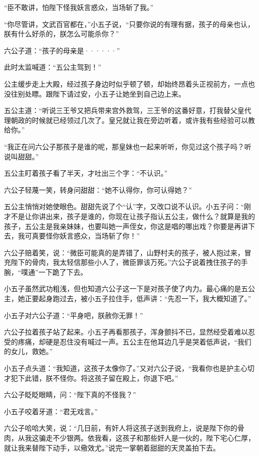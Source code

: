 “臣不敢讲，怕陛下怪我妖言惑众，当场斩了我。”

“你尽管讲，文武百官都在，”小五子说，“只要你说的有理有据，孩子的母亲也认，朕有什么好杀的，朕怎么可能杀你？”

六公子道：“孩子的母亲是······”

此时太监喊道：“五公主驾到！”
\newline

公主缓步走上大殿，经过孩子身边时似乎顿了顿，却始终昂着头正视前方，一点也没往别处瞟。跟陛下请过安，小五子让她坐到自己边上来。

五公主道：“听说三王爷又把兵带来宫外救驾，三王爷的这番好意，打我替父皇代理朝政的时候就已经领过几次了。皇兄就让我在旁边听着，或许我有些经验可以教给你。”

“我正在问六公子那孩子是谁的呢，那皇妹也一起来听听，你见过这个孩子吗？听说叫甜甜。”

五公主盯着孩子看了半天，才吐出三个字：“不认识。”

六公子轻蔑一笑，转身问甜甜：“她不认得你，你可认得她？”

五公主悄悄对她使眼色。甜甜先说了个“认”字，又改口说不认识。小五子问：“刚才不是让你讲出来，孩子是谁的，你现在让孩子指认五公主，做什么？就算是我的孩子，五公主是我亲妹妹，也要叫她一声侄女，你这是唱的哪出戏？你要是再讲下去，我可真要怪你妖言惑众，当场斩了你！”

六公子赔着笑，说：“微臣可能真的是弄错了，山野村夫的孩子，被人抱过来，冒充陛下的骨肉，我太轻信那些小人了，微臣罪该万死。”六公子说着拽住孩子的手腕，“噗通”一下跪了下去。

小五子虽然武功粗浅，但也知道六公子这一下是对孩子使了内力。最心痛的是五公主，她正要起身跑过去，被小五子拉住手，低声讲：“先忍一下，我大概知道了。”

小五子对六公子道：“平身吧，朕赦你无罪！”

六公子拉着孩子站了起来。小五子再看那孩子，浑身颤抖不已，显然经受着难以忍受的疼痛，却硬是忍住没有喊过一声。五公主在他耳边几乎是哭着低声说，“我们的女儿，救她。”

小五子点头道：“我知道，这孩子太像你了。”又对六公子说，“我看你也是护主心切才犯下此错，朕不怪你。将这孩子留在殿上，你退下吧。”

六公子眨眨眼睛，问：“陛下真的不怪我？”

小五子咬着牙道：“君无戏言。”

六公子哈哈大笑，说：“几日前，有奸人将这孩子送到我府上，说是陛下你的骨肉，从我这骗走不少银两。依我看，这孩子和那些奸人是一伙的，陛下宅心仁厚，就让我来替陛下动手，以儆效尤。”说完一掌朝着甜甜的天灵盖拍下去。

